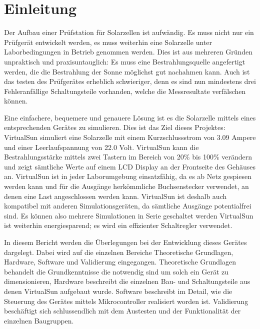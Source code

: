 \documentclass[a4paper]{fhnwreport} %
\begin{document}
\section{Einleitung}

Der Aufbau einer Prüfstation für Solarzellen ist aufwändig. Es muss nicht nur ein Prüfgerät entwickelt werden, es muss weiterhin eine Solarzelle unter Laborbedingungen in Betrieb genommen werden. Dies ist aus mehreren Gründen unpraktisch und praxisuntauglich: Es muss eine Bestrahlungsquelle angefertigt werden, die die Bestrahlung der Sonne möglichst gut nachahmen kann. Auch ist das testen des Prüfgerätes erheblich schwieriger, denn es sind nun mindestens drei Fehleranfällige Schaltungsteile vorhanden, welche die Messresultate verfälschen können. 

Eine einfachere, bequemere und genauere Lösung ist es die Solarzelle mittels eines entsprechenden Gerätes zu simulieren. Dies ist das Ziel dieses Projektes: VirtualSun simuliert eine Solarzelle mit einem Kurzschlussstrom von 3.09 Ampere und einer Leerlaufspannung von 22.0 Volt. VirtualSun kann die Bestrahlungsstärke mittels zwei Tastern im Bereich von 20\% bis 100\% verändern und zeigt sämtliche Werte auf einem LCD Display an der Frontseite des Gehäuses an. VirtualSun ist in jeder Laborumgebung einsatzfähig, da es ab Netz gespiesen werden kann und für die Ausgänge herkömmliche Buchsenstecker verwendet, an denen eine Last angeschlossen werden kann. VirtualSun ist deshalb auch kompatibel mit anderen Simulationsgeräten, da sämtliche Ausgänge potentialfrei sind. Es können also mehrere Simulationen in Serie geschaltet werden  VirtualSun ist weiterhin energiesparend; es wird ein effizienter Schaltregler verwendet. 

In diesem Bericht werden die Überlegungen bei der Entwicklung dieses Gerätes dargelegt. Dabei wird auf die einzelnen Bereiche Theoretische Grundlagen, Hardware, Software und Validierung eingegangen. Theoretische Grundlagen behandelt die Grundkenntnisse die notwendig sind um solch ein Gerät zu dimensionieren, Hardware  beschreibt die einzelnen Bau- und Schaltungsteile aus denen VirtualSun aufgebaut wurde. Software beschreibt im Detail, wie die Steuerung des Gerätes mittels Mikrocontroller realisiert worden ist. Validierung beschäftigt sich schlussendlich mit dem Austesten und der Funktionalität der einzelnen Baugruppen.
\newpage
%
%
\end{document}
